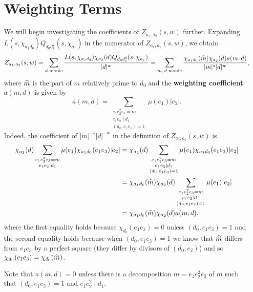 \documentclass[12pt,reqno,oneside]{amsart}
\begin{document}
\section{Weighting Terms}
    We will begin investigating the coefficients of $Z_{a_{1},a_{2}}(s,w)$ further. Expanding $L(s,\chi_{a_{1}d_{0}})Q_{d_{0}d_{1}^{2}}(s,\chi_{a_{1}})$ in the numerator of $Z_{a_{1},a_{2}}(s,w)$, we obtain
    \[
        Z_{a_{1},a_{2}}(s,w) = \sum_{\text{$d$ monic}}\frac{L(s,\chi_{a_{1}d_{0}})\chi_{a_{2}}(d)Q_{d_{0}d_{1}^{2}}(s,\chi_{a_{1}})}{|d|^{w}} = \sum_{\text{$m,d$ monic}}\frac{\chi_{a_{1}d_{0}}(\widehat{m})\chi_{a_{2}}(d)a(m,d)}{|m|^{s}|d|^{w}},
    \]
    where $\widehat{m}$ is the part of $m$ relatively prime to $d_{0}$ and the \textbf{weighting coefficient} $a(m,d)$ is given by
    \[
        a(m,d) = \sum_{\substack{e_{1}e_{2}^{2}e_{3} = m \\ e_{1}e_{2} \mid d_{1} \\ (d_{0},e_{1}e_{3}) = 1}}\mu(e_{1})|e_{2}|.
    \]
    Indeed, the coefficient of $|m|^{-s}|d|^{-w}$ in the definition of $Z_{a_{1},a_{2}}(s,w)$ is
    \begin{align*}
        \chi_{a_{2}}(d)\sum_{\substack{e_{1}e_{2}^{2}e_{3} = m \\ e_{1}e_{2} \mid d_{1}}}\mu(e_{1})\chi_{a_{1}d_{0}}(e_{1}e_{3})|e_{2}| &= \chi_{a_{2}}(d)\sum_{\substack{e_{1}e_{2}^{2}e_{3} = m \\ e_{1}e_{2} \mid d_{1} \\ (d_{0},e_{1}e_{3}) = 1}}\mu(e_{1})\chi_{a_{1}d_{0}}(e_{1}e_{3})|e_{2}| \\
        &= \chi_{a_{1}d_{0}}(\widehat{m})\chi_{a_{2}}(d)\sum_{\substack{e_{1}e_{2}^{2}e_{3} = m \\ e_{1}e_{2} \mid d_{1} \\ (d_{0},e_{1}e_{3}) = 1}}\mu(e_{1})|e_{2}| \\
        &= \chi_{a_{1}d_{0}}(\widehat{m})\chi_{a_{2}}(d)a(m,d),
    \end{align*}
    where the first equality holds because $\chi_{d_{0}}(e_{1}e_{3}) = 0$ unless $(d_{0},e_{1}e_{3}) = 1$ and the second equality holds because when $(d_{0},e_{1}e_{3}) = 1$ we know that $\widehat{m}$ differs from $e_{1}e_{3}$ by a perfect square (they differ by divisors of $(d_{0},e_{2})$) and so $\chi_{d_{0}}(e_{1}e_{3}) = \chi_{d_{0}}(\widehat{m})$. 
    
    \begin{remark}\label{rem:weighting_coefficient_remark}
        Note that $a(m,d) = 0$ unless there is a decomposition $m = e_{1}e_{2}^{2}e_{3}$ of $m$ such that $(d_{0},e_{1}e_{3}) = 1$ and $e_{1}e_{2}^{2} \mid d_{1}$.
    \end{remark}
\end{document}
